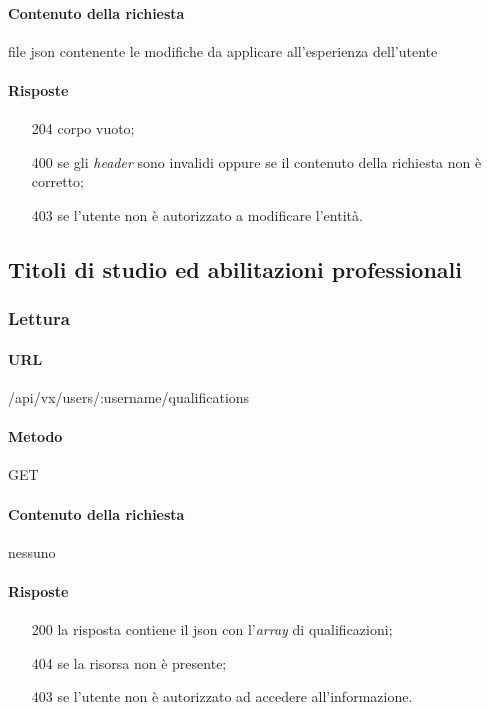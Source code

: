 \paragraph{Contenuto della richiesta}
file \gls{json} contenente le modifiche da applicare all'esperienza dell'utente
\paragraph{Risposte}
\begin{itemize}
	\item[204] corpo vuoto;
	\item[400] se gli \emph{header} sono invalidi oppure se il contenuto della richiesta non è corretto;
	\item[403] se l'utente non è autorizzato a modificare l'entità.
\end{itemize}


\subsection{Titoli di studio ed abilitazioni professionali}

\subsubsection{Lettura}
\paragraph{URL}
/api/vx/users/:username/qualifications
\paragraph{Metodo}
GET
\paragraph{Contenuto della richiesta}
nessuno
\paragraph{Risposte}
\begin{itemize}
	\item[200] la risposta contiene il \gls{json} con l'\emph{array} di qualificazioni;
	\item[404] se la risorsa non è presente;
	\item[403] se l'utente non è autorizzato ad accedere all'informazione.
\end{itemize}


